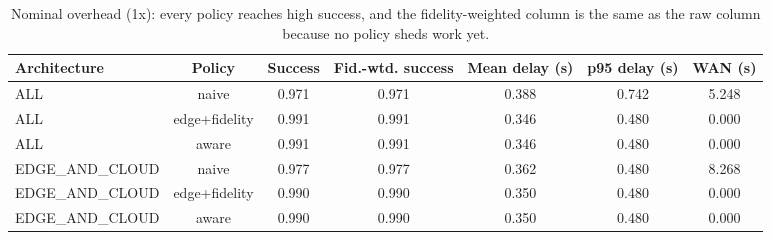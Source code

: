 \begin{table}
\centering
\small
\caption{Nominal overhead (1x): every policy reaches high success, and the fidelity-weighted column is the same as the raw column because no policy sheds work yet.}
\label{tab:p2-main}
\begin{tabular}{lcccccc}
\toprule
Architecture & Policy & Success & Fid.-wtd. success & Mean delay (s) & p95 delay (s) & WAN (s) \\
\midrule
ALL & naive & 0.971 & 0.971 & 0.388 & 0.742 & 5.248 \\
ALL & edge+fidelity & 0.991 & 0.991 & 0.346 & 0.480 & 0.000 \\
ALL & aware & 0.991 & 0.991 & 0.346 & 0.480 & 0.000 \\
EDGE\_AND\_CLOUD & naive & 0.977 & 0.977 & 0.362 & 0.480 & 8.268 \\
EDGE\_AND\_CLOUD & edge+fidelity & 0.990 & 0.990 & 0.350 & 0.480 & 0.000 \\
EDGE\_AND\_CLOUD & aware & 0.990 & 0.990 & 0.350 & 0.480 & 0.000 \\
\bottomrule
\end{tabular}
\par\vspace{2pt}{\footnotesize\raggedright ALL architecture, 30 devices, 2,100 requests per run, mean of 10 seeds. Fid.-wtd. success is the mean of success x fidelity over requests.\par}
\end{table}
